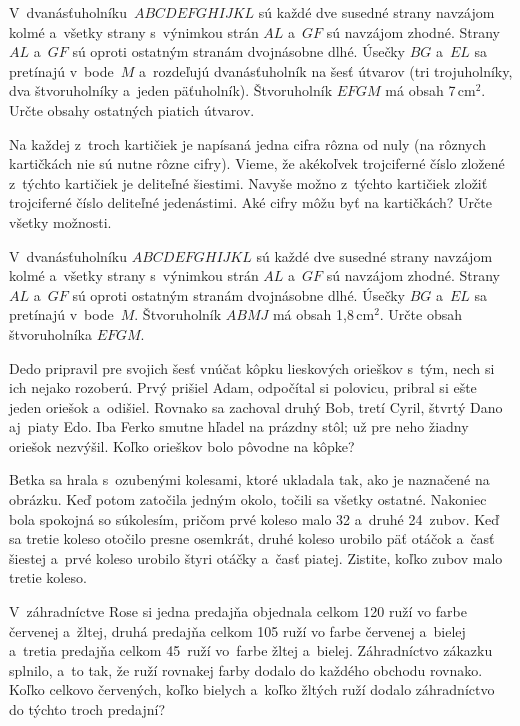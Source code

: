 {%
V~dvanásťuholníku~$ABCDEFGHIJKL$ sú každé dve susedné strany navzájom kolmé a~všetky strany s~výnimkou strán $AL$ a~$GF$ sú navzájom zhodné. Strany $AL$ a~$GF$ sú oproti ostatným stranám dvojnásobne dlhé. Úsečky $BG$ a~$EL$ sa pretínajú v~bode~$M$ a~rozdeľujú dvanásťuholník na šesť útvarov (tri trojuholníky, dva štvoruholníky a~jeden päťuholník). Štvoruholník $EFGM$ má obsah 7\,cm$^2$. Určte obsahy ostatných piatich útvarov.
%
}

{%
Na každej z~troch kartičiek je napísaná jedna cifra rôzna od nuly (na rôznych kartičkách nie sú nutne rôzne cifry). Vieme, že akékoľvek trojciferné číslo zložené z~týchto kartičiek je deliteľné šiestimi. Navyše možno z~týchto kartičiek zložiť trojciferné číslo deliteľné jedenástimi. Aké cifry môžu byť na kartičkách? Určte všetky možnosti.}

{%
V~dvanásťuholníku $ABCDEFGHIJKL$ sú každé dve susedné strany navzájom kolmé a~všetky strany s~výnimkou strán $AL$ a~$GF$ sú navzájom zhodné. Strany $AL$ a~$GF$ sú oproti ostatným stranám dvojnásobne dlhé. Úsečky $BG$ a~$EL$ sa pretínajú v~bode~$M$. Štvoruholník $ABMJ$ má obsah 1,8\,cm$^2$. Určte obsah štvoruholníka $EFGM$.
%
}

{%
Dedo pripravil pre svojich šesť vnúčat kôpku lieskových orieškov s~tým, nech si ich nejako rozoberú. Prvý prišiel Adam, odpočítal si polovicu, pribral si ešte jeden oriešok a~odišiel. Rovnako sa zachoval druhý Bob, tretí Cyril, štvrtý Dano aj~piaty Edo. Iba Ferko smutne hľadel na prázdny stôl; už pre neho žiadny oriešok nezvýšil. Koľko orieškov bolo pôvodne na kôpke?}

{%
Betka sa hrala s~ozubenými kolesami, ktoré ukladala tak, ako je naznačené na obrázku. Keď potom zatočila jedným okolo, točili sa všetky ostatné. Nakoniec bola spokojná so súkolesím, pričom prvé koleso malo 32 a~druhé 24~zubov. Keď sa tretie koleso otočilo presne osemkrát, druhé koleso urobilo päť otáčok a~časť šiestej a~prvé koleso urobilo štyri otáčky a~časť piatej. Zistite, koľko zubov malo tretie koleso.
%
}

{%
V~záhradníctve Rose si jedna predajňa objednala celkom 120 ruží vo farbe červenej a~žltej, druhá predajňa celkom 105 ruží vo farbe červenej a~bielej a~tretia predajňa celkom 45~ruží vo~farbe žltej a~bielej. Záhradníctvo zákazku splnilo, a~to tak, že ruží rovnakej farby dodalo do každého obchodu rovnako. Koľko celkovo červených, koľko bielych a~koľko žltých ruží dodalo záhradníctvo do týchto troch predajní?}

